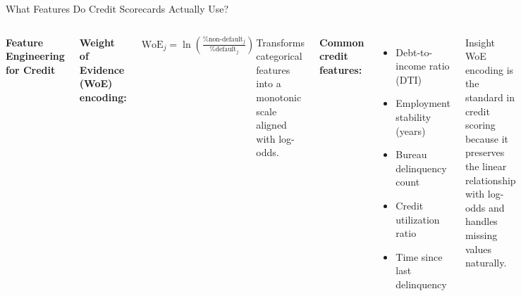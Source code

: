 \documentclass[8pt,aspectratio=169]{beamer}
\newenvironment{compactlist}{%
  \begin{itemize}%
    \setlength{\itemsep}{2pt}%
    \setlength{\parskip}{0pt}%
    \setlength{\parsep}{0pt}%
}{%
  \end{itemize}%
}
\begin{document}
\begin{frame}[t]{What Features Do Credit Scorecards Actually Use?}
\begin{columns}[T]
\small
\textbf{Feature Engineering for Credit}

\scriptsize
\textbf{Weight of Evidence (WoE) encoding:}

$\text{WoE}_j = \ln\!\left(\frac{\%\text{non-default}_j}{\%\text{default}_j}\right)$

Transforms categorical features into a monotonic scale aligned with log-odds.

\vspace{2mm}
\textbf{Common credit features:}
\begin{compactlist}
\item Debt-to-income ratio (DTI)
\item Employment stability (years)
\item Bureau delinquency count
\item Credit utilization ratio
\item Time since last delinquency
\end{compactlist}

\begin{block}{Insight}
\scriptsize WoE encoding is the standard in credit scoring because it preserves the linear relationship with log-odds and handles missing values naturally.
\end{block}

\footnotesize
\vspace{2mm}
\end{columns}
\end{frame}
\end{document}
